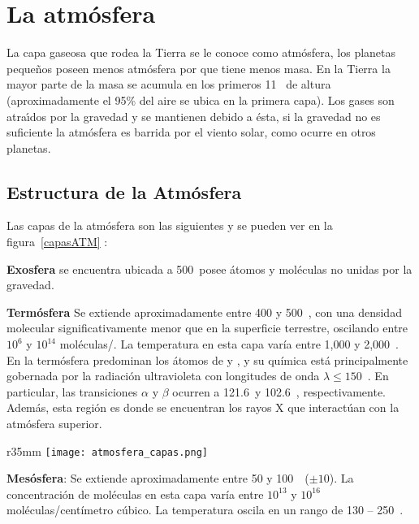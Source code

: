 \chapter{La atm\'osfera}
 
 La capa gaseosa que rodea la Tierra se le conoce como atm\'osfera, los planetas peque\~nos poseen menos atmósfera por que tiene menos masa. En la Tierra la  mayor parte de la masa se acumula en los primeros 11 \kilo\metre\,  de altura (aproximadamente el 95\% del aire se ubica en la primera capa). Los gases son atra\'{\i}dos por la gravedad y se mantienen debido a \'esta, si la gravedad no es suficiente la atm\'osfera es barrida por el viento solar, como ocurre en otros planetas.


 \section{Estructura de la Atm\'osfera}
  Las capas de la atm\'osfera son las siguientes y se pueden ver en la figura~\ref{capasATM} :


\textbf{Exosfera}  se encuentra ubicada a 500\kilo\metre\, posee \'atomos y mol\'eculas no unidas por la gravedad.

\textbf{ Term\'osfera }Se extiende aproximadamente entre 400 y 500~\kilo\metre, con una densidad molecular significativamente menor que en la superficie terrestre, oscilando entre $10^6$ y $10^{14}$ moléculas/\centi\cubic\metre. La temperatura en esta capa varía entre 1,000 y 2,000~\kelvin.  
En la termósfera predominan los átomos de  y , y su química está principalmente gobernada por la radiación ultravioleta con longitudes de onda $\lambda \leq 150$~\nano\metre. En particular, las transiciones $\alpha$ y $\beta$ ocurren a 121.6~\nano\metre   y 102.6~\nano\metre, respectivamente. Además, esta región es donde se encuentran los rayos X que interactúan con la atmósfera superior.
 \begin{wrapfigure}[27]{r}{35mm}
\centering
\texttt{[image: atmosfera\_capas.png]}
\caption{Capas de la atm\'osfera}
\label{capasATM}
\end{wrapfigure}

\textbf{Mesósfera}: Se extiende aproximadamente entre 50 y 100~\kilo\metre~($\pm10$). La concentración de moléculas en esta capa varía entre $10^{13}$ y $10^{16}$ moléculas/centímetro cúbico. La temperatura oscila en un rango de 130 -- 250~\kelvin.  

